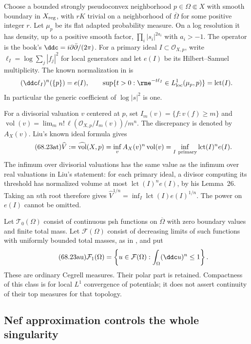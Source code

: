 Choose a bounded strongly pseudoconvex neighborhood
$p\in\Omega\Subset X$ with smooth boundary in $X_{\rm reg}$,
with $rK$ trivial on a neighborhood of $\overline\Omega$ for some
positive integer $r$.
Let $\mu_p$ be its flat adapted probability measure. On a log
resolution it has density, up to a positive smooth factor,
$\prod_i|s_i|^{2a_i}$ with $a_i>-1$.
The operator is the book's $\ddc=i\partial\bar\partial/(2\pi)$.
For a primary ideal $I\subset\mathcal O_{X,p}$, write
$\ell_I=\log\sum_j|f_j|^2$ for local generators and let $e(I)$
be its Hilbert--Samuel multiplicity. The known normalization in
\cite[Proposition~4.1]{GuedjTrusiani25LocalPublished} is
\[
 (\ddc\ell_I)^n(\{p\})=e(I),
 \qquad
 \sup\{t>0:\rme^{-t\ell_I}\in L^1_{\rm loc}(\mu_p,p)\}
   =\operatorname{lct}(I).
\]
In particular the generic coefficient of $\log|s|^2$ is one.

For a divisorial valuation $v$ centered at $p$, set
$I_m(v)=\{f:v(f)\geq m\}$ and
$\operatorname{vol}(v)=\lim_m n!\,\ell(\mathcal O_{X,p}/I_m(v))/m^n$.
The discrepancy is denoted by $A_X(v)$. Liu's known ideal formula
\cite[Theorem~27]{Liu18VolumeV5} gives
\[
\tag{68.23at}\label{eq:ytd-local-normalized-volume}
 \widehat V:=\widehat{\operatorname{vol}}(X,p)
 =\inf_v A_X(v)^n\operatorname{vol}(v)
 =\inf_{I\ {\rm primary}}\operatorname{lct}(I)^n e(I).
\]
The infimum over divisorial valuations has the same value as the
infimum over real valuations in Liu's statement: for each primary
ideal, a divisor computing its threshold has normalized volume at
most $\operatorname{lct}(I)^n e(I)$, by his Lemma~26.
Taking an $n$th root therefore gives
$\widehat V^{1/n}=\inf_I\operatorname{lct}(I)e(I)^{1/n}$.
The power on $e(I)$ cannot be omitted.

Let $\mathcal T_0(\Omega)$ consist of continuous psh functions on
$\overline\Omega$ with zero boundary values and finite total mass.
Let $\mathcal F(\Omega)$ consist of decreasing limits of such
functions with uniformly bounded total masses, as in
\cite[Definition~2.6]{GuedjTrusiani25LocalPublished}, and put
\[
\tag{68.23au}\label{eq:ytd-local-klt-mass-class}
 \mathcal F_1(\Omega)
 =\left\{u\in\mathcal F(\Omega):
                \int_\Omega(\ddc u)^n\leq1\right\}.
\]
These are ordinary Cegrell measures. Their polar part is retained.
Compactness of this class is for local $L^1$ convergence of potentials;
it does not assert continuity of their top measures for that topology.

\subsection{Nef approximation controls the whole singularity}
\label{sec:ytd-local-klt-ideal-comparison}

